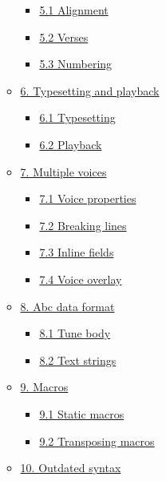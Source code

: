 \begin{itemize}
\begin{itemize}
    \begin{itemize}
    \item
      \protect\hyperlink{alignment}{5.1 Alignment}
    \item
      \protect\hyperlink{verses}{5.2 Verses}
    \item
      \protect\hyperlink{numbering}{5.3 Numbering}
    \end{itemize}
  \item
    \protect\hyperlink{typesetting_and_playback}{6. Typesetting and
    playback}

    \begin{itemize}
    \item
      \protect\hyperlink{typesetting}{6.1 Typesetting}
    \item
      \protect\hyperlink{playback}{6.2 Playback}
    \end{itemize}
  \item
    \protect\hyperlink{multiple_voices}{7. Multiple voices}

    \begin{itemize}
    \item
      \protect\hyperlink{voice_properties}{7.1 Voice properties}
    \item
      \protect\hyperlink{breaking_lines}{7.2 Breaking lines}
    \item
      \protect\hyperlink{inline_fields}{7.3 Inline fields}
    \item
      \protect\hyperlink{voice_overlay}{7.4 Voice overlay}
    \end{itemize}
  \item
    \protect\hyperlink{abc_data_format}{8. Abc data format}

    \begin{itemize}
    \item
      \protect\hyperlink{tune_body}{8.1 Tune body}
    \item
      \protect\hyperlink{text_strings}{8.2 Text strings}
    \end{itemize}
  \item
    \protect\hyperlink{macros}{9. Macros}

    \begin{itemize}
    \item
      \protect\hyperlink{static_macros}{9.1 Static macros}
    \item
      \protect\hyperlink{transposing_macros}{9.2 Transposing macros}
    \end{itemize}
  \item
    \protect\hyperlink{outdated_syntax}{10. Outdated syntax}


\end{itemize}
\end{itemize}
